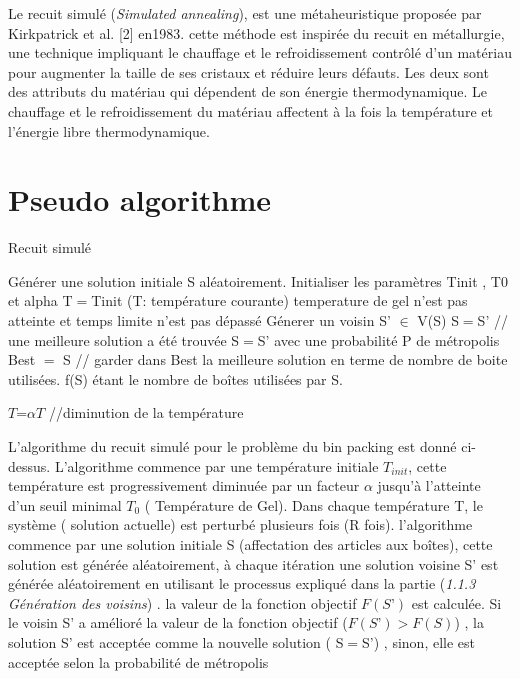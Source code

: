 \documentclass[12pt]{article}
\begin{document}
    Le recuit simulé (\emph{Simulated annealing}), est une métaheuristique proposée par Kirkpatrick et al. [2] en1983. cette méthode est inspirée du recuit en métallurgie, une technique impliquant le chauffage et le refroidissement contrôlé d'un matériau pour augmenter la taille de ses cristaux et réduire leurs défauts. Les deux sont des attributs du matériau qui dépendent de son énergie thermodynamique. Le chauffage et le refroidissement du matériau affectent à la fois la température et l'énergie libre thermodynamique.

\section{Pseudo algorithme}

\begin{algorithm}[H]
    \caption{Recuit simulé}
    \begin{algorithmic}
    \STATE Générer une solution initiale S aléatoirement. 
    \STATE Initialiser les paramètres Tinit , T0 et alpha 
    \STATE T$=$Tinit  (T: température courante)
        \STATE temperature de gel n'est pas atteinte et temps limite n'est pas dépassé
        \REPEAT{}
            \STATE Génerer un voisin S' $\in$ V(S) 
                \STATE S$=$S' // une meilleure solution a été trouvée 
            \ELSE
                \STATE S$=$S' avec une probabilité P de métropolis 
            \ENDIF
                \STATE  Best $=$ S // garder dans Best la meilleure solution en terme de nombre de boite utilisées. f(S) étant le nombre de                 boîtes utilisées par S.

            \ENDIF
        \STATE $T$=$ \alpha T $  //diminution de la température 
    \ENDWHILE
     
\end{algorithmic}
\end{algorithm}

    L’algorithme du recuit simulé pour le problème du bin packing est donné ci-dessus.
 L’algorithme commence par une température initiale \emph{$T_{init}$}, cette température est progressivement diminuée par un facteur $\alpha$ jusqu'à l’atteinte d’un seuil minimal \emph{$T_{0}$} ( Température de Gel). 
Dans chaque température T, le système ( solution actuelle) est perturbé plusieurs fois (R fois). 
l’algorithme commence par une solution initiale S (affectation des articles aux boîtes), 
cette solution est générée aléatoirement, à chaque itération une solution voisine S’ est générée aléatoirement en utilisant le processus expliqué dans la partie (\emph{1.1.3 Génération des voisins}) . 
la valeur de la fonction objectif $F (S’)$ est calculée. 
Si le voisin S’ a amélioré la valeur de la fonction objectif ($ F(S’)> F(S)$)  , 
la solution S’ est acceptée comme la nouvelle solution ( S$= $S’) , sinon, elle est acceptée selon la probabilité de métropolis \newline
\end{document}
